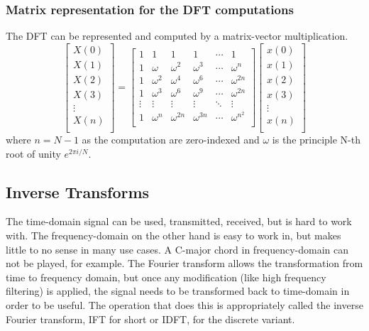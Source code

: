 \subsubsection{Matrix representation for the DFT computations} 
The DFT can be represented and computed by a matrix-vector multiplication. 
$$
\begin{bmatrix}
    X(0) \\
    X(1) \\
    X(2) \\
    X(3) \\
    \vdots\\
    X(n) \\
\end{bmatrix}
=
\begin{bmatrix}
    1 & 1 & 1 & 1 & \cdots & 1\\
    1 & \omega & \omega ^2 & \omega ^3 & \cdots & \omega ^n\\
    1 & \omega ^2 & \omega ^4 & \omega ^6 & \cdots & \omega ^{2n}\\
    1 & \omega ^3 & \omega ^6 & \omega ^9 & \cdots & \omega ^{2n}\\
    \vdots & \vdots & \vdots & \vdots & \ddots & \vdots \\
    1 & \omega ^{n} & \omega ^{2n} & \omega ^{3n} & \cdots & \omega ^{{n^2}}\\
\end{bmatrix}
\begin{bmatrix}
    x(0) \\
    x(1) \\
    x(2) \\
    x(3) \\
    \vdots\\
    x(n) \\
\end{bmatrix}
$$
where $n = N-1$ as the computation are zero-indexed and $\omega$ is the principle N-th root of unity $e^{2\pi i/N} $. 


\subsection{Inverse Transforms}
The time-domain signal can be used, transmitted, received, but is hard to work with. The frequency-domain on the other hand is easy to work in, but makes little to no sense in many use cases. A C-major chord in frequency-domain can not be played, for example. The Fourier transform allows the transformation from time to frequency domain, but once any modification (like high frequency filtering) is applied, the signal needs to be transformed back to time-domain in order to be useful. The operation that does this is appropriately called the inverse Fourier transform, IFT for short or IDFT, for the discrete variant.

